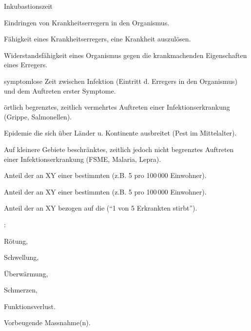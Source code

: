 \begin{labeling}[~--]{Inkubastionszeit}
  \item[\T{Infektion}] Eindringen von
  Krankheitserregern in den Organismus.
  \item[\T{Pathogenität}]
  Fähigkeit eines Krankheitserregers, eine Krankheit
  auszulösen.
  \item[\T{Resistenz}]
  Widerstandsfähigkeit eines Organismus gegen die
  krankmachenden Eigenschaften eines Erregers.
  \item[\T{Inkubationszeit}]
   symptomlose Zeit zwischen Infektion (Eintritt d.
  Erregers in den Organismus) und dem Auftreten erster Symptome.
  \item[\T{Epidemie}] örtlich
  begrenztes, zeitlich vermehrtes Auftreten einer  Infektionserkrankung
  (Grippe, Salmonellen).
  \item[\T{Pandemie}] Epidemie die sich
  über Länder u. Kontinente ausbreitet (Pest im Mittelalter).
  \item[\T{Endemie}] Auf kleinere Gebiete
  beschränktes, zeitlich jedoch nicht begrenztes Auftreten einer Infektionserkrankung  (FSME,
  Malaria, Lepra).
  \item[\T{Morbidität}] Anteil der
  an XY  einer bestimmten 
  (z.B. 5 pro 100\,000 Einwohner).
  \item[\T{Mortalität}] Anteil der
  an XY  einer bestimmten 
  (z.B. 5 pro 100\,000 Einwohner).
  \item[\T{Letalität}]  Anteil der
  an XY  bezogen auf die  ("`1 von 5 Erkrankten stirbt"').
  \item[\T{Entzündung}] : \begin{inparaenum}
\item Rötung,
\item Schwell\-ung,
\item Überwärmung,
\item Schmerzen,
\item Funktionsverlust.
\end{inparaenum}
\item[\T{Prophylaxe}]  Vorbeugende
Massnahme(n).
\end{labeling}

